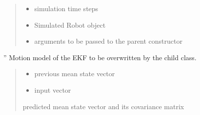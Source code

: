 \documentclass[letterpaper,10pt,english]{sphinxmanual}
\begin{document}
\begin{fulllineitems}
\begin{fulllineitems}
\begin{quote}
\begin{description}
\begin{itemize}
\item {} 
\sphinxAtStartPar
{} \textendash{} simulation time steps

\item {} 
\sphinxAtStartPar
{} \textendash{} Simulated Robot object

\item {} 
\sphinxAtStartPar
{} \textendash{} arguments to be passed to the parent constructor

\end{itemize}

\end{description}\end{quote}

\end{fulllineitems}


\begin{fulllineitems}
\label{\detokenize{GFLocalization:EKF_3DOFDifferentialDriveCtVelocity.EKF_3DOFDifferentialDriveCtVelocity.f}}
\pysigstartsignatures
{}
\pysigstopsignatures
\sphinxAtStartPar
”
Motion model of the EKF to be overwritten by the child class.
\begin{quote}\begin{description}
\begin{itemize}
\item {} 
\sphinxAtStartPar
{} \textendash{} previous mean state vector

\item {} 
\sphinxAtStartPar
{} \textendash{} input vector

\end{itemize}

\sphinxAtStartPar
predicted mean state vector and its covariance matrix

\end{description}\end{quote}


\end{fulllineitems}
\end{fulllineitems}
\end{document}
